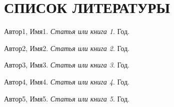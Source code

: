 \documentclass[14pt]{article}
\begin{document}
\section{СПИСОК ЛИТЕРАТУРЫ}
\renewcommand\refname{}

\begin{thebibliography}{5}
    Автор1, Имя1.
    \emph{Статья или книга 1}.
    Год.
    
    Автор2, Имя2.
    \emph{Статья или книга 2}.
    Год.

    Автор3, Имя3.
    \emph{Статья или книга 3}.
    Год.

    Автор4, Имя4.
    \emph{Статья или книга 4}.
    Год.

    Автор5, Имя5.
    \emph{Статья или книга 5}.
    Год.
    \end{thebibliography}
\end{document}
